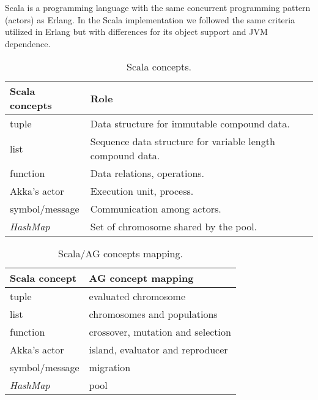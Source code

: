 
Scala is a programming language with the same concurrent programming pattern (actors) as Erlang. In the Scala implementation we followed the same criteria utilized in Erlang but with differences for its object support and JVM dependence.


\begin{table*}\small
  \centering
   \caption{Scala concepts.}\label{sclConstructions}
\begin{tabular}{|>{\centering\arraybackslash}p{3.4cm}|>{\centering\arraybackslash}p{7cm}|}
  \hline
  \textbf{Scala concepts} & \textbf{Role} \tabularnewline
  \hline
  tuple & Data structure for immutable compound data. \tabularnewline
    \hline
 list & Sequence data structure for variable length compound data.
 \tabularnewline
    \hline
 function & Data relations, operations. \tabularnewline
     \hline
    Akka's actor & Execution unit, process. \tabularnewline
     \hline
  symbol/message & Communication among actors. \tabularnewline
     \hline
  {\em HashMap} & Set of chromosome shared by the pool. \tabularnewline
     \hline
\end{tabular}

\end{table*}

\begin{table*}\small
  \centering
  \caption{Scala/AG concepts mapping.}\label{sclAGRelation}
\begin{tabular}{|>{\centering\arraybackslash}p{3cm}|>{\centering\arraybackslash}p{6cm}|}
  \hline
  \textbf{Scala concept} & \textbf{AG concept mapping} \tabularnewline
  \hline
   tuple & evaluated chromosome \tabularnewline
    \hline
 list & chromosomes and populations \tabularnewline
    \hline
 function & crossover, mutation and selection \tabularnewline
    \hline
  Akka's actor & island, evaluator and reproducer \tabularnewline
     \hline
  symbol/message & migration \tabularnewline
     \hline
  {\em HashMap} & pool \tabularnewline
     \hline
\end{tabular}

\end{table*}






